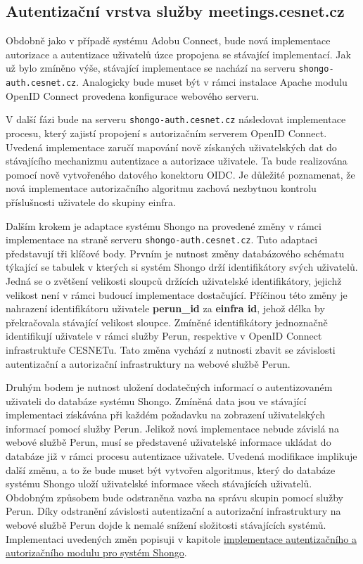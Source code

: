 \documentclass[
  printed, %
  twoside, %
  table,   %
  nolof,     %
  nolot,     %
]{fithesis3}
\begin{document}
\subsection{Autentizační vrstva služby meetings.cesnet.cz}
Obdobně jako v případě systému Adobu Connect, bude nová implementace autorizace a autentizace uživatelů úzce propojena se stávající implementací. Jak už bylo zmíněno výše, stávající implementace se nachází na serveru \texttt{shongo-auth.cesnet.cz}. Analogicky bude muset být v rámci instalace Apache modulu OpenID Connect provedena konfigurace webového serveru. \par
V další fázi bude na serveru \texttt{shongo-auth.cesnet.cz} následovat implementace procesu, který zajistí propojení s autorizačním serverem OpenID Connect. Uvedená implementace zaručí mapování nově získaných uživatelských dat do stávajícího mechanizmu autentizace a autorizace uživatele. Ta bude realizována pomocí nově vytvořeného datového konektoru OIDC. Je důležité poznamenat, že nová implementace autorizačního algoritmu zachová nezbytnou kontrolu příslušnosti uživatele do skupiny einfra. 
\par

Dalším krokem je adaptace systému Shongo na provedené změny v rámci implementace na straně serveru \texttt{shongo-auth.cesnet.cz}. Tuto adaptaci představují tři klíčové body. Prvním je nutnost změny databázového schématu týkající se tabulek v kterých si systém Shongo drží identifikátory svých uživatelů. Jedná se o zvětšení velikosti sloupců držících uživatelské identifikátory, jejichž velikost není v rámci budoucí implementace dostačující. Příčinou této změny je nahrazení identifikátoru uživatele \textbf{perun\_id} za \textbf{einfra id}, jehož délka by překračovala stávající velikost sloupce. Zmíněné identifikátory jednoznačně identifikují uživatele v rámci služby Perun, respektive v OpenID Connect infrastruktuře CESNETu. Tato změna vychází z nutnosti zbavit se závislosti autentizační a autorizační infrastruktury na webové službě Perun. \par

Druhým bodem je nutnost uložení dodatečných informací o autentizovaném uživateli do databáze systému Shongo. Zmíněná data jsou ve stávající implementaci získávána při každém požadavku na zobrazení uživatelských informací pomocí služby Perun. Jelikož nová implementace nebude závislá na webové službě Perun, musí se představené uživatelské informace ukládat do databáze již v rámci procesu autentizace uživatele. Uvedená modifikace implikuje další změnu, a to že bude muset být vytvořen algoritmus, který do databáze systému Shongo uloží uživatelské informace všech stávajících uživatelů. Obdobným způsobem bude odstraněna vazba na správu skupin pomocí služby Perun. Díky odstranění závislosti autentizační a autorizační infrastruktury na webové službě Perun dojde k nemalé snížení složitosti stávajících systémů. Implementaci uvedených změn popisuji v kapitole \hyperref[ShongoImpl]{implementace autentizačního a autorizačního modulu pro systém Shongo}. \par 
\end{document}

